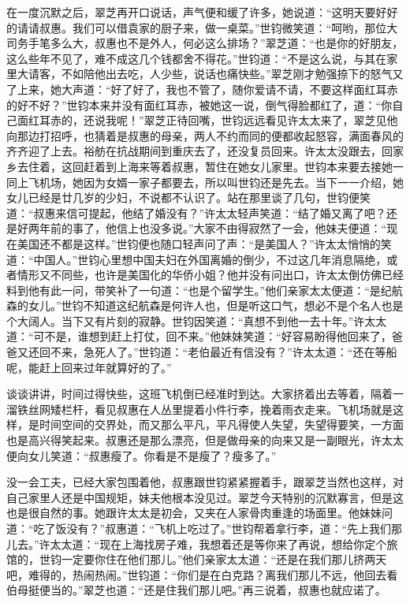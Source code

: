 \par 在一度沉默之后，翠芝再开口说话，声气便和缓了许多，她说道：“这明天要好好的请请叔惠。我们可以借袁家的厨子来，做一桌菜。”世钧微笑道：“呵哟，那位大司务手笔多么大，叔惠也不是外人，何必这么排场？”翠芝道：“也是你的好朋友，这么些年不见了，难不成这几个钱都舍不得花。”世钧道：“不是这么说，与其在家里大请客，不如陪他出去吃，人少些，说话也痛快些。”翠芝刚才勉强捺下的怒气又了上来，她大声道：“好了好了，我也不管了，随你爱请不请，不要这样面红耳赤的好不好？”世钧本来并没有面红耳赤，被她这一说，倒气得脸都红了，道：“你自己面红耳赤的，还说我呢！”翠芝正待回嘴，世钧远远看见许太太来了，翠芝见他向那边打招呼，也猜着是叔惠的母亲，两人不约而同的便都收起怒容，满面春风的齐齐迎了上去。裕舫在抗战期间到重庆去了，还没复员回来。许太太没跟去，回家乡去住着，这回赶着到上海来等着叔惠，暂住在她女儿家里。世钧本来要去接她一同上飞机场，她因为女婿一家子都要去，所以叫世钧还是先去。当下一一介绍，她女儿已经是廿几岁的少妇，不说都不认识了。站在那里谈了几句，世钧便笑道：“叔惠来信可提起，他结了婚没有？”许太太轻声笑道：“结了婚又离了吧？还是好两年前的事了，他信上也没多说。”大家不由得寂然了一会，他妹夫便道：“现在美国还不都是这样。”世钧便也随口轻声问了声：“是美国人？”许太太悄悄的笑道：“中国人。”世钧心里想中国夫妇在外国离婚的倒少，不过这几年消息隔绝，或者情形又不同些，也许是美国化的华侨小姐？他并没有问出口，许太太倒仿佛已经料到他有此一问，带笑补了一句道：“也是个留学生。”他们亲家太太便道：“是纪航森的女儿。”世钧不知道这纪航森是何许人也，但是听这口气，想必不是个名人也是个大阔人。当下又有片刻的寂静。世钧因笑道：“真想不到他一去十年。”许太太道：“可不是，谁想到赶上打仗，回不来。”他妹妹笑道：“好容易盼得他回来了，爸爸又还回不来，急死人了。”世钧道：“老伯最近有信没有？”许太太道：“还在等船呢，能赶上回来过年就算好的了。”
\par 谈谈讲讲，时间过得快些，这班飞机倒已经准时到达。大家挤着出去等着，隔着一溜铁丝网矮栏杆，看见叔惠在人丛里提着小件行李，挽着雨衣走来。飞机场就是这样，是时间空间的交界处，而又那么平凡，平凡得使人失望，失望得要笑，一方面也是高兴得笑起来。叔惠还是那么漂亮，但是做母亲的向来又是一副眼光，许太太便向女儿笑道：“叔惠瘦了。你看是不是瘦了？瘦多了。”
\par 没一会工夫，已经大家包围着他，叔惠跟世钧紧紧握着手，跟翠芝当然也这样，对自己家里人还是中国规矩，妹夫他根本没见过。翠芝今天特别的沉默寡言，但是这也是很自然的事。她跟许太太是初会，又夹在人家骨肉重逢的场面里。他妹妹问道：“吃了饭没有？”叔惠道：“飞机上吃过了。”世钧帮着拿行李，道：“先上我们那儿去。”许太太道：“现在上海找房子难，我想着还是等你来了再说，想给你定个旅馆的，世钧一定要你住在他们那儿。”他们亲家太太道：“还是在我们那儿挤两天吧，难得的，热闹热闹。”世钧道：“你们是在白克路？离我们那儿不远，他回去看伯母挺便当的。”翠芝也道：“还是住我们那儿吧。”再三说着，叔惠也就应诺了。

